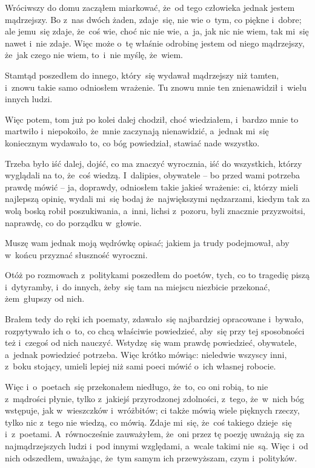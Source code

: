 \documentclass[a4paper,11pt]{article}
\begin{document}
Wróciwszy do domu zacząłem miarkować, że~od tego człowieka jednak
jestem mądrzejszy. Bo z~nas dwóch żaden, zdaje~się, nie wie o~tym, co
piękne i~dobre; ale jemu~się zdaje, że~coś wie, choć nic nie wie,
a~ja, jak nic nie wiem, tak mi~się nawet i~nie zdaje. Więc może o~tę
właśnie odrobinę jestem od niego mądrzejszy, że~jak czego nie wiem,
to~i~nie myślę, że~wiem.

Stamtąd poszedłem do innego, który~się wydawał mądrzejszy niż tamten,
i~znowu takie samo odniosłem wrażenie. Tu znowu mnie ten znienawidził
i~wielu innych ludzi.

Więc potem, tom już po kolei dalej chodził, choć wiedziałem, i~bardzo
mnie to martwiło i~niepokoiło, że~mnie zaczynają nienawidzić, a~jednak
mi~się koniecznym wydawało to, co bóg powiedział, stawiać nade
wszystko.

Trzeba było iść dalej, dojść, co ma znaczyć wyrocznia, iść do
wszystkich, którzy wyglądali na to, że~coś wiedzą. I~dalipies,
obywatele -- bo przed wami potrzeba prawdę mówić -- ja, doprawdy,
odniosłem takie jakieś wrażenie: ci, którzy mieli najlepszą opinię,
wydali mi~się bodaj że~największymi nędzarzami, kiedym tak za wolą
boską robił poszukiwania, a~inni, lichsi z~pozoru, byli znacznie
przyzwoitsi, naprawdę, co do porządku w~głowie.

Muszę wam jednak moją wędrówkę opisać; jakiem ja trudy podejmował, aby
w~końcu przyznać słuszność wyroczni.

Otóż po rozmowach z~politykami poszedłem do poetów, tych, co to
tragedię piszą i~dytyramby, i~do innych, żeby~się tam na miejscu
niezbicie przekonać, żem~głupszy od nich.

Brałem tedy do ręki ich poematy, zdawało~się najbardziej opracowane
i~bywało, rozpytywało ich o~to, co chcą właściwie powiedzieć, aby~się
przy tej sposobności też i~czegoś od nich nauczyć. Wstydzę~się wam
prawdę powiedzieć, obywatele, a~jednak powiedzieć potrzeba. Więc
krótko mówiąc: nieledwie wszyscy inni, z~boku stojący, umieli lepiej
niż sami poeci mówić o~ich własnej robocie.

Więc i~o~poetach~się przekonałem niedługo, że~to, co oni robią, to nie
z~mądrości płynie, tylko z~jakiejś przyrodzonej zdolności, z~tego,
że~w~nich bóg wstępuje, jak w~wieszczków i~wróżbitów; ci także mówią
wiele pięknych rzeczy, tylko nic z~tego nie wiedzą, co mówią. Zdaje
mi~się, że~coś takiego dzieje~się i~z~poetami. A~równocześnie
zauważyłem, że~oni przez tę poezję uważają~się za najmądrzejszych
ludzi i~pod innymi względami, a~wcale takimi nie~są. Więc i~od nich
odszedłem, uważając, że~tym samym ich przewyższam, czym i~polityków.
\end{document}
